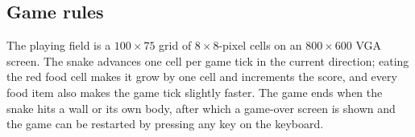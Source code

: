 \documentclass[11pt,a4paper]{article}
\begin{document}
\subsection{Game rules}
The playing field is a $100\times75$ grid of $8\times8$-pixel cells on an
$800\times600$ VGA screen. The snake advances one cell per game tick in
the current direction; eating the red food cell makes it grow by one cell
and increments the score, and every food item also makes the game tick
slightly faster. The game ends when the snake hits a wall or its own
body, after which a game-over screen is shown and the game can be
restarted by pressing any key on the keyboard.


\end{document}
